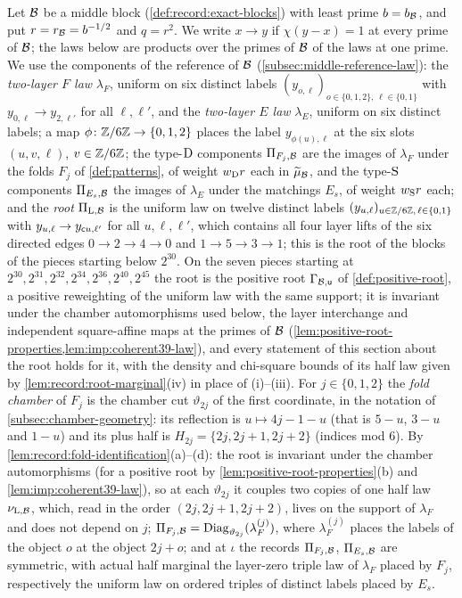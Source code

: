 Let $\mathcal B$ be a middle block (\cref{def:record:exact-blocks}) with least prime
$b=b_\mathcal B$, and put $r=r_\mathcal B=b^{-1/2}$ and $q=r^2$. We write $x\to y$ if
$\chi(y-x)=1$ at every prime of $\mathcal B$; the laws below are products over the
primes of $\mathcal B$ of the laws at one prime. We use the components of the
reference of $\mathcal B$ (\cref{subsec:middle-reference-law}): the \emph{two-layer $F$
law} $\lambda_F$, uniform on six distinct labels
$(y_{o,\ell})_{o\in\{0,1,2\},\,\ell\in\{0,1\}}$ with $y_{0,\ell}\to y_{2,\ell'}$ for
all $\ell,\ell'$, and the \emph{two-layer $E$ law} $\lambda_E$, uniform on six
distinct labels; a map $\phi\colon\mathbb Z/6\mathbb Z\to\{0,1,2\}$ places the label
$y_{\phi(u),\ell}$ at the six slots $(u,v,\ell)$, $v\in\mathbb Z/6\mathbb Z$; the type-$\rm D$
components $\Pi_{F_j,\mathcal B}$ are the images of $\lambda_F$ under the folds $F_j$
of \cref{def:patterns}, of weight $w_{\rm D}r$ each in $\widetilde\mu_\mathcal B$, and the
type-$\rm S$ components $\Pi_{E_s,\mathcal B}$ the images of $\lambda_E$ under the matchings
$E_s$, of weight $w_{\rm S}r$ each; and the \emph{root} $\Pi_{\mathrm L,\mathcal B}$ is the
uniform law on twelve distinct labels $(y_{u,\ell})_{u\in\mathbb Z/6\mathbb Z,\,\ell\in\{0,1\}}$
with $y_{u,\ell}\to y_{\mathsf c u,\ell'}$ for all $u,\ell,\ell'$, which contains all four
layer lifts of the six directed edges $0\to2\to4\to0$ and $1\to5\to3\to1$; this
is the root of the blocks of the pieces starting below $2^{30}$. On the seven
pieces starting at $2^{30},2^{31},2^{32},2^{34},2^{36},2^{40},2^{45}$ the root is the positive root
$\Gamma_{\mathcal B,\mathsf u}$ of \cref{def:positive-root}, a positive reweighting of the
uniform law with the same support; it is invariant under the
chamber automorphisms used below, the layer interchange and independent
square-affine maps at the primes of $\mathcal B$
(\cref{lem:positive-root-properties,lem:imp:coherent39-law}),
and every statement of this section about the root holds for it, with the
density and chi-square bounds of its half law given by
\cref{lem:record:root-marginal}(iv) in place of (i)--(iii). For $j\in\{0,1,2\}$ the
\emph{fold chamber} of $F_j$ is the chamber cut $\vartheta_{2j}$ of the first
coordinate, in the notation of \cref{subsec:chamber-geometry}: its reflection
is $u\mapsto4j-1-u$ (that is $5-u$, $3-u$ and $1-u$) and its plus half is
$H_{2j}=\{2j,2j+1,2j+2\}$ (indices mod $6$). By
\cref{lem:record:fold-identification}(a)--(d): the root is invariant under the
chamber automorphisms (for a positive root by
\cref{lem:positive-root-properties}(b) and \cref{lem:imp:coherent39-law}), so at each $\vartheta_{2j}$ it couples
two copies of one half law $\nu_{\mathrm L,\mathcal B}$, which, read in the order
$(2j,2j+1,2j+2)$, lives on the support of $\lambda_F$ and does not depend on $j$;
$\Pi_{F_j,\mathcal B}=\operatorname{Diag}_{\vartheta_{2j}}(\lambda_F^{(j)})$, where
$\lambda_F^{(j)}$ places the labels of the object $o$ at the object $2j+o$; and
at $\iota$ the records $\Pi_{F_j,\mathcal B}$, $\Pi_{E_s,\mathcal B}$ are symmetric, with
actual half marginal the layer-zero triple law of $\lambda_F$ placed by $F_j$,
respectively the uniform law on ordered triples of distinct labels placed by
$E_s$.

